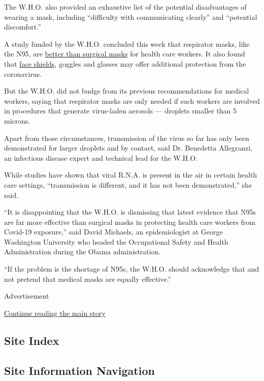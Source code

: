 The W.H.O. also provided an exhaustive list of the potential
disadvantages of wearing a mask, including ``difficulty with
communicating clearly'' and ``potential discomfort.''

A study funded by the W.H.O. concluded this week that respirator masks,
like the N95, are
\href{https://www.nytimes.com/2020/06/01/health/masks-surgical-N95-coronavirus.html}{better
than surgical masks} for health care workers. It also found that
\href{https://www.nytimes.com/article/face-shield-mask-california-coronavirus.html}{face
shields}, goggles and glasses may offer additional protection from the
coronavirus.

But the W.H.O. did not budge from its previous recommendations for
medical workers, saying that respirator masks are only needed if such
workers are involved in procedures that generate virus-laden aerosols
--- droplets smaller than 5 microns.

Apart from those circumstances, transmission of the virus so far has
only been demonstrated for larger droplets and by contact, said Dr.
Benedetta Allegranzi, an infectious disease expert and technical lead
for the W.H.O.

While studies have shown that viral R.N.A. is present in the air in
certain health care settings, ``transmission is different, and it has
not been demonstrated,'' she said.

``It is disappointing that the W.H.O. is dismissing that latest evidence
that N95s are far more effective than surgical masks in protecting
health care workers from Covid-19 exposure,'' said David Michaels, an
epidemiologist at George Washington University who headed the
Occupational Safety and Health Administration during the Obama
administration.

``If the problem is the shortage of N95s, the W.H.O. should acknowledge
that and not pretend that medical masks are equally effective.''

Advertisement

\protect\hyperlink{after-bottom}{Continue reading the main story}

\hypertarget{site-index}{%
\subsection{Site Index}\label{site-index}}

\hypertarget{site-information-navigation}{%
\subsection{Site Information
Navigation}\label{site-information-navigation}}


